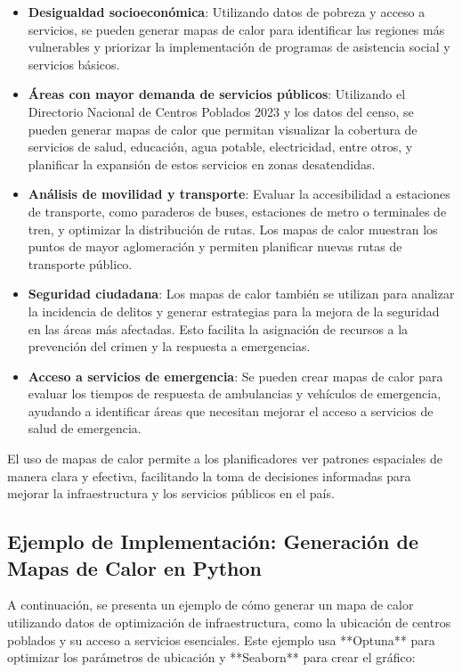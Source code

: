 \documentclass{article}
\begin{document}
{\begin{itemize}
	\item \textbf{Desigualdad socioeconómica}: Utilizando datos de pobreza y acceso a servicios, se pueden generar mapas de calor para identificar las regiones más vulnerables y priorizar la implementación de programas de asistencia social y servicios básicos.
	\item \textbf{Áreas con mayor demanda de servicios públicos}: Utilizando el Directorio Nacional de Centros Poblados 2023 y los datos del censo, se pueden generar mapas de calor que permitan visualizar la cobertura de servicios de salud, educación, agua potable, electricidad, entre otros, y planificar la expansión de estos servicios en zonas desatendidas.
	\item \textbf{Análisis de movilidad y transporte}: Evaluar la accesibilidad a estaciones de transporte, como paraderos de buses, estaciones de metro o terminales de tren, y optimizar la distribución de rutas. Los mapas de calor muestran los puntos de mayor aglomeración y permiten planificar nuevas rutas de transporte público.
	\item \textbf{Seguridad ciudadana}: Los mapas de calor también se utilizan para analizar la incidencia de delitos y generar estrategias para la mejora de la seguridad en las áreas más afectadas. Esto facilita la asignación de recursos a la prevención del crimen y la respuesta a emergencias.
	\item \textbf{Acceso a servicios de emergencia}: Se pueden crear mapas de calor para evaluar los tiempos de respuesta de ambulancias y vehículos de emergencia, ayudando a identificar áreas que necesitan mejorar el acceso a servicios de salud de emergencia.
\end{itemize}

El uso de mapas de calor permite a los planificadores ver patrones espaciales de manera clara y efectiva, facilitando la toma de decisiones informadas para mejorar la infraestructura y los servicios públicos en el país.

\subsection*{Ejemplo de Implementación: Generación de Mapas de Calor en Python}
A continuación, se presenta un ejemplo de cómo generar un mapa de calor utilizando datos de optimización de infraestructura, como la ubicación de centros poblados y su acceso a servicios esenciales. Este ejemplo usa **Optuna** para optimizar los parámetros de ubicación y **Seaborn** para crear el gráfico:

}
\end{document}
